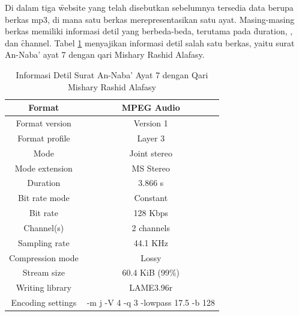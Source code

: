   Di dalam tiga \f{website} yang telah disebutkan sebelumnya tersedia data berupa berkas mp3, di mana satu berkas merepresentasikan satu ayat. Masing-masing berkas memiliki informasi detil yang berbeda-beda, terutama pada \f{duration}, \br, dan \f{channel}. Tabel \ref{table:format berkas 078007 alafasy} menyajikan informasi detil salah satu berkas, yaitu surat An-Naba' ayat 7 dengan qari Mishary Rashid Alafasy.

  \begin{table}
    \centering
    \caption{Informasi Detil Surat An-Naba' Ayat 7 dengan Qari Mishary Rashid Alafasy}
    \begin{tabular}{|c|c|}
      \hline
      Format                         & MPEG Audio \\ \hline
      Format version                 & Version 1 \\ \hline
      Format profile                 & Layer 3 \\ \hline
      Mode                           & Joint stereo \\ \hline
      Mode extension                 & MS Stereo \\ \hline
      Duration                       & 3.866 s \\ \hline
      Bit rate mode                  & Constant \\ \hline
      Bit rate                       & 128 Kbps \\ \hline
      Channel(s)                     & 2 channels \\ \hline
      Sampling rate                  & 44.1 KHz \\ \hline
      Compression mode               & Lossy \\ \hline
      Stream size                    & 60.4 KiB (99\%) \\ \hline
      Writing library                & LAME3.96r \\ \hline
      Encoding settings              & -m j -V 4 -q 3 -lowpass 17.5 -b 128 \\ \hline
    \end{tabular}
    \label{table:format berkas 078007 alafasy}
  \end{table}




